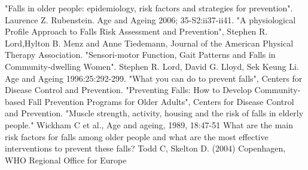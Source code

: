 \begin{thebibliography}{99}
"Falls in older people: epidemiology, risk factors and strategies for prevention". Laurence Z. Rubenstein. Age and Ageing 2006; 35-S2:ii37-ii41.
"A physiological Profile Approach to Falls Risk Assessment and Prevention", Stephen R. Lord,Hylton B. Menz and Anne Tiedemann, Journal of the American Physical Therapy Association. 
"Sensori-motor Function, Gait Patterns and Falls in Community-dwelling Women". Stephen R. Lord, David G. Lloyd, Sek Keung Li. Age and Ageing 1996:25:292-299.
	"What you can do to prevent falls", Centers for Disease Control and Prevention.
	"Preventing Falls: How to Develop Community­based Fall Prevention Programs for Older Adults", Centers for Disease Control and Prevention.
"Muscle strength, activity, housing and the risk of falls in elderly people." Wickham C et al., Age and ageing, 1989, 18:47-51 
What are the main risk factors for falls among older people and what are the most effective interventions to prevent these falls? Todd C, Skelton D. (2004) Copenhagen, WHO Regional Office for Europe 
 
\end{thebibliography}